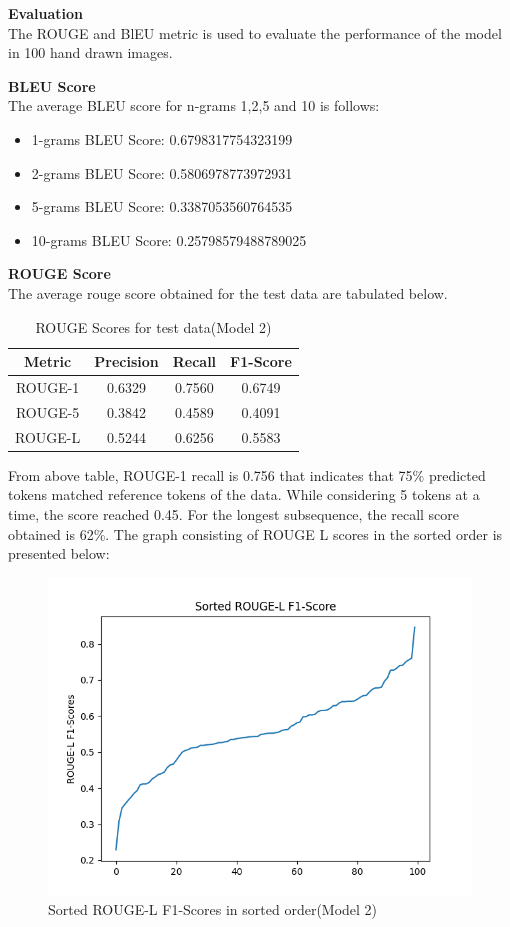 \textbf{Evaluation}\\
    The ROUGE and BlEU metric is used to evaluate the performance of the model in 100 hand drawn images.

\textbf{BLEU Score}\\
The average BLEU score for n-grams 1,2,5 and 10 is follows:
\begin{itemize}
    \item 1-grams BLEU Score: 0.6798317754323199
    \item 2-grams BLEU Score: 0.5806978773972931
    \item 5-grams BLEU Score:  0.3387053560764535
    \item 10-grams BLEU Score: 0.25798579488789025
\end{itemize}

\textbf{ROUGE Score}\\
The average rouge score obtained for the test data are tabulated below.
\begin{table}[H]
    \caption{ROUGE Scores for test data(Model 2)}
    \label{tab:samp}
    \centering
    \begin{tabular}{|c|c|c|c|}
        \hline
        \textbf{Metric} & \textbf{Precision} & \textbf{Recall} &\textbf{F1-Score}\\
        \hline
        ROUGE-1 & 0.6329 & 0.7560 &0.6749 \\
        \hline
        ROUGE-5 & 0.3842 & 0.4589 & 0.4091 \\
        \hline
        ROUGE-L & 0.5244 & 0.6256 & 0.5583 \\
        \hline
    \end{tabular}
\end{table}
From above table, ROUGE-1 recall is 0.756 that indicates that 75\% predicted tokens matched reference tokens of the data.  While considering 5 tokens at a time, the score reached 0.45. For the longest subsequence, the recall score obtained is 62\%. The graph consisting of ROUGE L scores in the sorted order is presented below:
\begin{figure}[H]
    \includegraphics[scale=.8]{images/sr2.png}
    \caption{Sorted ROUGE-L F1-Scores in sorted order(Model 2)}
    \label{fig:srlf}
\end{figure}
